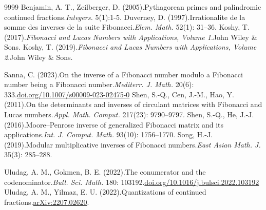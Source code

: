 \documentclass[10pt,a4paper]{amsart}
\numberwithin{equation}{section}
\numberwithin{table}{section}
\numberwithin{figure}{section}
\begin{document}
\begin{thebibliography}{9999}
Benjamin, A. T., Zeilberger, D. (2005).Pythagorean primes and palindromic continued fractions.\emph{Integers.} 5(1):1-5.
Duverney, D. (1997).Irrationalite de la somme des inverses de la suite Fibonacci.\emph{Elem. Math.} 52(1): 31--36.
Koshy, T. (2017).\emph{Fibonacci and Lucas Numbers with Applications, Volume 1}.John Wiley \& Sons.
Koshy, T. (2019).\emph{Fibonacci and Lucas Numbers with Applications, Volume 2}.John Wiley \& Sons.


Sanna, C. (2023).On the inverse of a Fibonacci number modulo a Fibonacci number being a Fibonacci number.\emph{Mediterr. J. Math.} 20(6): 333.\href{https://doi.org/10.1007/s00009-023-02475-0}{doi.org/10.1007/s00009-023-02475-0}
Shen, S.-Q., Cen, J.-M., Hao, Y. (2011).On the determinants and inverses of circulant matrices with Fibonacci and Lucas numbers.\emph{Appl. Math. Comput.} 217(23): 9790--9797.
Shen, S.-Q., He, J.-J. (2016).Moore--Penrose inverse of generalized Fibonacci matrix and its applications.\emph{Int. J. Comput. Math.} 93(10): 1756--1770.
Song, H.-J. (2019).Modular multiplicative inverses of Fibonacci numbers.\emph{East Asian Math. J.} 35(3): 285--288.


Uludag, A. M., Gokmen, B. E. (2022).The conumerator and the codenominator.\emph{Bull. Sci. Math.} 180: 103192.\href{https://doi.org/10.1016/j.bulsci.2022.103192}{doi.org/10.1016/j.bulsci.2022.103192}
Uludag, A. M., Yilmaz, E. U. (2022).Quantizations of continued fractions.\href{https://arxiv.org/abs/2207.02620}{arXiv:2207.02620}.
\end{thebibliography}



\medskip%
\end{document}
